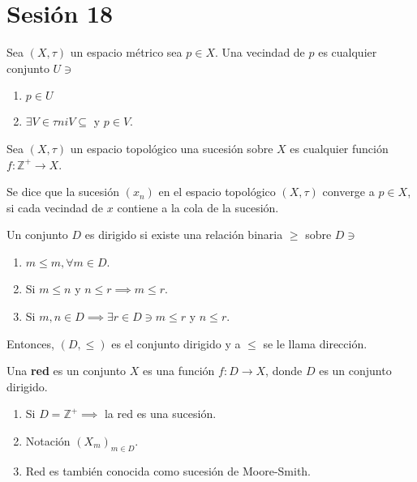 \section{Sesión 18}

\begin{definicion}
	Sea $(X,\tau)$ un espacio métrico sea $p\in X$. Una vecindad de $p$ es cualquier conjunto $U\ni$ 
	\begin{enumerate}
		\item $p\in U$
		\item $\exists V\in \tau ni V\subseteq$ y $p\in V$. 
	\end{enumerate}
\end{definicion}

\begin{definicion}
	Sea $(X,\tau)$ un espacio topológico una sucesión sobre $X$ es cualquier función $f:\mathbb{Z}^+\to X$. 
\end{definicion}

\begin{definicion}
	Se dice que la sucesión $(x_n)$ en el espacio topológico $(X,\tau)$ converge a $p\in X$, si cada vecindad de $x$ contiene a la cola de la sucesión. 
\end{definicion}

\begin{definicion}
	Un conjunto $D$ es dirigido si existe una relación binaria $\geqslant$ sobre $D\ni$ 
	\begin{enumerate}
		\item $m\leqslant m, \forall m\in D$. 
		\item Si $m\leqslant n$ y $n\leqslant r\implies m\leqslant r$. 
		\item Si $m,n\in D\implies \exists r\in D\ni m\leqslant r$ y $n\leqslant r$. 
	\end{enumerate}
Entonces, $(D,\leqslant)$ es el conjunto dirigido y a $\leqslant$ se le llama dirección. 
\end{definicion}

\begin{definicion}
	Una \textbf{red} es un conjunto $X$ es una función $f:D\to X$, donde $D$ es un conjunto dirigido. 
\end{definicion}
\begin{enumerate}
	\item Si $D=\mathbb{Z}^+\implies$ la red es una sucesión.
	\item Notación $(X_m)_{m\in D}$. 
	\item Red es también conocida como sucesión de Moore-Smith.
\end{enumerate}



